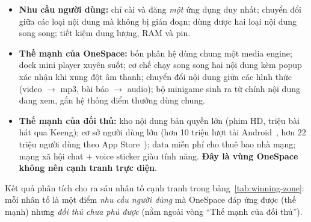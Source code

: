 \begin{itemize}
    \item \textcolor{vennneeds}{\textbf{Nhu cầu người dùng:}} chỉ cài và đăng \textit{một} ứng dụng duy nhất; chuyển đổi giữa các loại nội dung mà không bị gián đoạn; dùng được hai loại nội dung song song; tiết kiệm dung lượng, RAM và pin.
    \item \textcolor{vennours}{\textbf{Thế mạnh của OneSpace:}} bốn phân hệ dùng chung một media engine; dock mini player xuyên suốt; cơ chế chạy song song hai nội dung kèm popup xác nhận khi xung đột âm thanh; chuyển đổi nội dung giữa các hình thức (video $\rightarrow$ mp3, bài báo $\rightarrow$ audio); bộ minigame sinh ra từ chính nội dung đang xem, gắn hệ thống điểm thưởng dùng chung.
    \item \textcolor{venncomp}{\textbf{Thế mạnh của đối thủ:}} kho nội dung bản quyền lớn (phim HD, triệu bài hát qua Keeng); cơ sở người dùng lớn (hơn 10 triệu lượt tải Android~\cite{mocha-googleplay}, hơn 22 triệu người dùng theo App Store~\cite{mocha-appstore}); data miễn phí cho thuê bao nhà mạng; mạng xã hội chat + voice sticker giàu tính năng. \textbf{Đây là vùng OneSpace không nên cạnh tranh trực diện}.
\end{itemize}

Kết quả phân tích cho ra sáu nhân tố cạnh tranh trong bảng~\ref{tab:winning-zone}: mỗi nhân tố là một điểm \textit{nhu cầu người dùng} mà OneSpace đáp ứng được (thế mạnh) nhưng \textit{đối thủ chưa phủ được} (nằm ngoài vòng ``Thế mạnh của đối thủ'').

